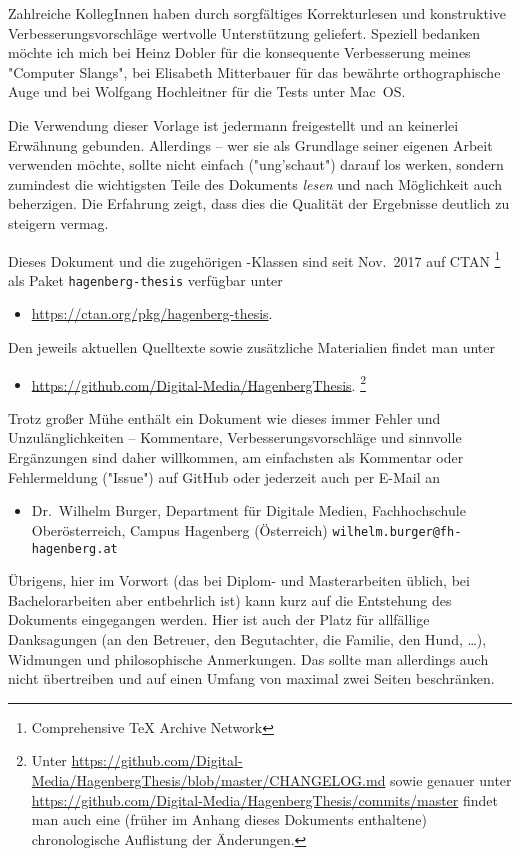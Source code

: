 Zahlreiche KollegInnen haben durch sorgfältiges Korrekturlesen und
konstruktive Verbesserungsvorschläge wertvolle Unterstützung
geliefert. Speziell bedanken möchte ich mich bei Heinz Dobler für
die konsequente Verbesserung meines "Computer Slangs", bei
Elisabeth Mitterbauer für das bewährte orthographische Auge und
bei Wolfgang Hochleitner für die Tests unter Mac~OS.

Die Verwendung dieser Vorlage ist jedermann freigestellt und an
keinerlei Erwähnung gebunden. Allerdings -- wer sie als Grundlage
seiner eigenen Arbeit verwenden möchte, sollte nicht einfach
("ung'schaut") darauf los werken, sondern zumindest die
wichtigsten Teile des Dokuments \emph{lesen} und nach Möglichkeit
auch beherzigen. Die Erfahrung zeigt, dass dies die Qualität der
Ergebnisse deutlich zu steigern vermag.

Dieses Dokument und die zugehörigen \latex-Klassen sind seit Nov.\ 2017 auf CTAN%
\footnote{Comprehensive TeX Archive Network} 
als Paket \texttt{hagenberg-thesis} verfügbar unter
%
\begin{itemize}
\item[]\url{https://ctan.org/pkg/hagenberg-thesis}.
\end{itemize}
%
Den jeweils aktuellen Quelltexte sowie zusätzliche Materialien findet man unter
%
\begin{itemize}
\item[]\url{https://github.com/Digital-Media/HagenbergThesis}.%
\footnote{Unter \url{https://github.com/Digital-Media/HagenbergThesis/blob/master/CHANGELOG.md}
sowie genauer unter \url{https://github.com/Digital-Media/HagenbergThesis/commits/master} 
findet man auch eine (früher im Anhang dieses Dokuments enthaltene) chronologische Auflistung der 
Änderungen.}
\end{itemize}



\noindent
Trotz großer Mühe enthält ein Dokument wie dieses immer Fehler und Unzulänglichkeiten
-- Kommentare, Verbesserungsvorschläge und sinnvolle Ergänzungen
sind daher willkommen, am einfachsten als Kommentar oder Fehlermeldung ("Issue") 
auf GitHub oder jederzeit auch per E-Mail an
%
\begin{itemize}
\item[]
Dr.\ Wilhelm Burger, Department für Digitale Medien,\newline
Fachhochschule Oberösterreich, Campus Hagenberg (Österreich)\newline
\nolinkurl{wilhelm.burger@fh-hagenberg.at}
\end{itemize}

\noindent
Übrigens, hier im Vorwort (das bei Diplom- und Masterarbeiten üblich, bei Bachelorarbeiten 
aber entbehrlich ist) kann kurz auf die Entstehung des Dokuments eingegangen werden.
Hier ist auch der Platz für allfällige Danksagungen (\zB an den Betreuer, 
den Begutachter, die Familie, den Hund, \ldots), Widmungen und philosophische 
Anmerkungen. Das sollte man allerdings auch nicht übertreiben und auf 
einen Umfang von maximal zwei Seiten beschränken.




